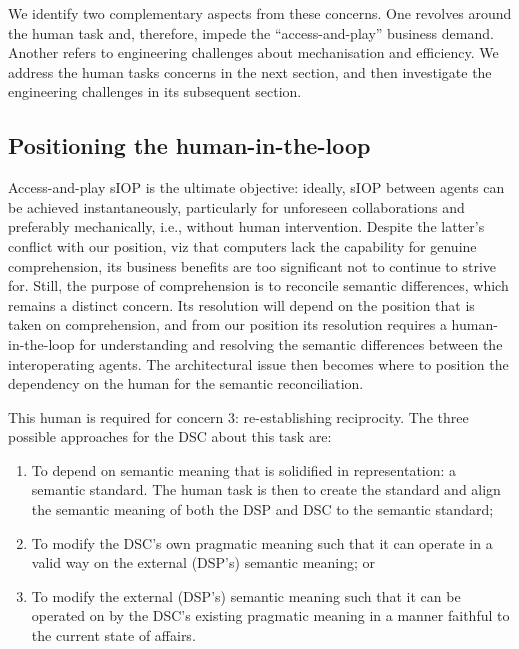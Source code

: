 \documentclass[sort&compress,preprint,authoryear,3p,twocolumn]{elsarticle}
\providecommand{\tightlist}{%
  \setlength{\itemsep}{0pt}\setlength{\parskip}{0pt}}
\begin{document}
We identify two complementary aspects from these concerns. One revolves
around the human task and, therefore, impede the ``access-and-play''
business demand. Another refers to engineering challenges about
mechanisation and efficiency. We address the human tasks concerns in the
next section, and then investigate the engineering challenges in its
subsequent section.

\hypertarget{positioning-the-human-in-the-loop}{%
\subsection{Positioning the
human-in-the-loop}\label{positioning-the-human-in-the-loop}}

Access-and-play sIOP is the ultimate objective: ideally, sIOP between
agents can be achieved instantaneously, particularly for unforeseen
collaborations and preferably mechanically, i.e., without human
intervention. Despite the latter's conflict with our position, viz that
computers lack the capability for genuine comprehension, its business
benefits are too significant not to continue to strive for. Still, the
purpose of comprehension is to reconcile semantic differences, which
remains a distinct concern. Its resolution will depend on the position
that is taken on comprehension, and from our position its resolution
requires a human-in-the-loop for understanding and resolving the
semantic differences between the interoperating agents. The
architectural issue then becomes where to position the dependency on the
human for the semantic reconciliation.

This human is required for concern 3: re-establishing reciprocity. The
three possible approaches for the DSC about this task are:

\begin{enumerate}
\def\labelenumi{\roman{enumi}.}
\tightlist
\item
  To depend on semantic meaning that is solidified in representation: a
  semantic standard. The human task is then to create the standard and
  align the semantic meaning of both the DSP and DSC to the semantic
  standard;
\item
  To modify the DSC's own pragmatic meaning such that it can operate in
  a valid way on the external (DSP's) semantic meaning; or
\item
  To modify the external (DSP's) semantic meaning such that it can be
  operated on by the DSC's existing pragmatic meaning in a manner
  faithful to the current state of affairs.
\end{enumerate}
\end{document}
